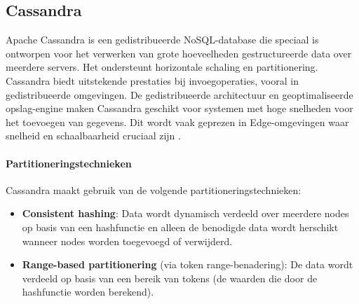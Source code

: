 \subsection{Cassandra}

Apache Cassandra is een gedistribueerde NoSQL-database die speciaal is ontworpen voor het verwerken van grote hoeveelheden gestructureerde data over meerdere servers. Het ondersteunt horizontale schaling en partitionering. Cassandra biedt uitstekende prestaties bij invoegoperaties, vooral in gedistribueerde omgevingen. De gedistribueerde architectuur en geoptimaliseerde opslag-engine maken Cassandra geschikt voor systemen met hoge snelheden voor het toevoegen van gegevens. Dit wordt vaak geprezen in Edge-omgevingen waar snelheid en schaalbaarheid cruciaal zijn \autocite{CassandraDocumentation}.

\paragraph{Partitioneringstechnieken}  
Cassandra maakt gebruik van de volgende partitioneringstechnieken:
\begin{itemize}
    \item \textbf{Consistent hashing}: Data wordt dynamisch verdeeld over meerdere nodes op basis van een hashfunctie en alleen de benodigde data wordt herschikt wanneer nodes worden toegevoegd of verwijderd.
    \item \textbf{Range-based partitionering} (via token range-benadering): De data wordt verdeeld op basis van een bereik van tokens (de waarden die door de hashfunctie worden berekend).
\end{itemize}

\begin{table}[h]
    \centering
    \caption{Overzicht van de specificaties van Apache Cassandra. \cite{CassandraDocumentation}}
\end{table}

